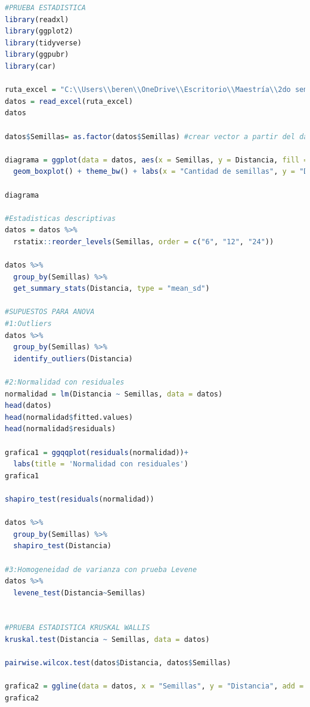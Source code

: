 \documentclass{article}
\begin{document}
\begin{lstlisting}[language=R, caption= Código para hacer la prueba estadística Kruskal Wallis.]
#PRUEBA ESTADISTICA
library(readxl)
library(ggplot2)
library(tidyverse)
library(ggpubr)
library(car)

ruta_excel = "C:\\Users\\beren\\OneDrive\\Escritorio\\Maestría\\2do semestre\\5. Simulación computacional de nanomateriales\\Tareas\\Tarea_4\\datos.xlsx"
datos = read_excel(ruta_excel)
datos

datos$Semillas= as.factor(datos$Semillas) #crear vector a partir del dataframe

diagrama = ggplot(data = datos, aes(x = Semillas, y = Distancia, fill = Semillas)) +
  geom_boxplot() + theme_bw() + labs(x = "Cantidad de semillas", y = "Distancia Manhattan")

diagrama

#Estadisticas descriptivas
datos = datos %>%
  rstatix::reorder_levels(Semillas, order = c("6", "12", "24"))

datos %>%
  group_by(Semillas) %>%
  get_summary_stats(Distancia, type = "mean_sd")

#SUPUESTOS PARA ANOVA
#1:Outliers
datos %>%
  group_by(Semillas) %>%
  identify_outliers(Distancia)

#2:Normalidad con residuales
normalidad = lm(Distancia ~ Semillas, data = datos)
head(datos)
head(normalidad$fitted.values)
head(normalidad$residuals)

grafica1 = ggqqplot(residuals(normalidad))+
  labs(title = 'Normalidad con residuales')
grafica1

shapiro_test(residuals(normalidad))

datos %>%
  group_by(Semillas) %>%
  shapiro_test(Distancia)

#3:Homogeneidad de varianza con prueba Levene
datos %>%
  levene_test(Distancia~Semillas)


#PRUEBA ESTADISTICA KRUSKAL WALLIS
kruskal.test(Distancia ~ Semillas, data = datos)

pairwise.wilcox.test(datos$Distancia, datos$Semillas)

grafica2 = ggline(data = datos, x = "Semillas", y = "Distancia", add = c("mean_se", "jitter"))
grafica2
  
\end{lstlisting}
\end{document}
